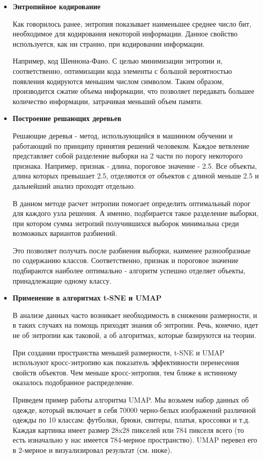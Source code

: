 \begin{itemize}
	\item \textbf{Энтропийное кодирование}~\
	
	Как говорилось ранее, энтропия показывает наименьшее среднее число бит, необходимое для кодирования некоторой информации. Данное свойство используется, как ни странно, при кодировании информации.
	
	Например, код Шеннона-Фано. С целью минимизации энтропии и, соответственно, оптимизации кода элементы с большой вероятностью появления кодируются меньшим числом символом. Таким образом, производится сжатие объема информации, что позволяет передавать большее количество информации, затрачивая меньший объем памяти.
	
	\item \textbf{Построение решающих деревьев}
	
	Решающие деревья - метод, использующийся в машинном обучении и работающий по принципу принятия решений человеком. Каждое ветвление представляет собой разделение выборки на 2 части по порогу некоторого признака. Например, признак - длина, пороговое значение -  2.5. Все объекты, длина которых превышает 2.5, отделяются от объектов с длиной меньше 2.5 и дальнейший анализ проходят отдельно.
	
	В данном методе расчет энтропии помогает определить оптимальный порог для каждого узла решения. А именно, подбирается такое разделение выборки, при котором сумма энтропий получившихся выборок минимальна среди возможных вариантов разбиений.
	
	Это позволяет получать после разбиения выборки, наименее разнообразные по содержанию классов. Соответственно, признак и пороговое значение подбираются наиболее оптимально - алгоритм успешно отделяет объекты, принадлежащие одному классу.
	
	\item \textbf{Применение в алгоритмах t-SNE и UMAP}
	
	В анализе данных часто возникает необходимость в снижении размерности, и в таких случаях на помощь приходят знания об энтропии. Речь, конечно, идет не об энтропии как таковой, а об алгоритмах, которые базируются на теории.
	
	При создании пространства меньшей размерности, t-SNE и UMAP используют кросс-энтропию как показатель эффективности перенесения свойств объектов. Чем меньше кросс-энтропия, тем ближе к истинному оказалось подобранное распределение.
	
	Приведем пример работы алгоритма UMAP. Мы возьмем набор данных об одежде, который включает в себя 70000 черно-белых изображений различной одежды по 10 классам: футболки, брюки, свитеры, платья, кроссовки и т.д. Каждая картинка имеет размер 28x28 пикселей или 784 пикселя всего (то есть изначально у нас имеется 784-мерное пространство). UMAP перевел его в 2-мерное и визуализировал результат (см. ниже).
	

\end{itemize}
